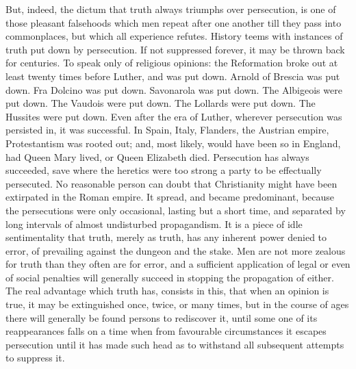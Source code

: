 \documentclass[12pt]{report}
\begin{document}
But, indeed, the dictum that truth always triumphs over persecution, is one of those pleasant falsehoods which men repeat after one another till they pass into commonplaces, but which all experience refutes. History teems with instances of truth put down by persecution. If not suppressed forever, it may be thrown back for centuries. To speak only of religious opinions: the Reformation broke out at least twenty times before Luther, and was put down. Arnold of Brescia was put down. Fra Dolcino was put down. Savonarola was put down. The Albigeois were put down. The Vaudois were put down. The Lollards were put down. The Hussites were put down. Even after the era of Luther, wherever persecution was persisted in, it was successful. In Spain, Italy, Flanders, the Austrian empire, Protestantism was rooted out; and, most likely, would have been so in England, had Queen Mary lived, or Queen Elizabeth died. Persecution has always succeeded, save where the heretics were too strong a party to be effectually persecuted. No reasonable person can doubt that Christianity might have been extirpated in the Roman empire. It spread, and became predominant, because the persecutions were only occasional, lasting but a short time, and separated by long intervals of almost undisturbed propagandism. It is a piece of idle sentimentality that truth, merely as truth, has any inherent power denied to error, of prevailing against the dungeon and the stake. Men are not more zealous for truth than they often are for error, and a sufficient application of legal or even of social penalties will generally succeed in stopping the propagation of either. The real advantage which truth has, consists in this, that when an opinion is true, it may be extinguished once, twice, or many times, but in the course of ages there will generally be found persons to rediscover it, until some one of its reappearances falls on a time when from favourable circumstances it escapes persecution until it has made such head as to withstand all subsequent attempts to suppress it.
\end{document}
